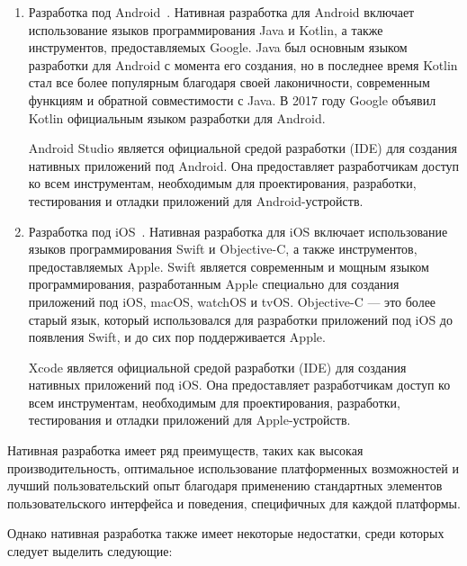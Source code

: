 \documentclass[14pt, russian]{scrartcl}
\begin{document}
\begin{enumerate}
    \item Разработка под Android~\cite{android-dev}. Нативная разработка для Android включает использование языков программирования Java и Kotlin, а также инструментов, предоставляемых Google. Java был основным языком разработки для Android с момента его создания, но в последнее время Kotlin стал все более популярным благодаря своей лаконичности, современным функциям и обратной совместимости с Java. В 2017 году Google объявил Kotlin официальным языком разработки для Android.

    Android Studio является официальной средой разработки (IDE) для создания нативных приложений под Android. Она предоставляет разработчикам доступ ко всем инструментам, необходимым для проектирования, разработки, тестирования и отладки приложений для Android-устройств.
    \item Разработка под iOS~\cite{ios-dev}. Нативная разработка для iOS включает использование языков программирования Swift и Objective-C, а также инструментов, предоставляемых Apple. Swift является современным и мощным языком программирования, разработанным Apple специально для создания приложений под iOS, macOS, watchOS и tvOS. Objective-C --- это более старый язык, который использовался для разработки приложений под iOS до появления Swift, и до сих пор поддерживается Apple.

    Xcode является официальной средой разработки (IDE) для создания нативных приложений под iOS. Она предоставляет разработчикам доступ ко всем инструментам, необходимым для проектирования, разработки, тестирования и отладки приложений для Apple-устройств.
\end{enumerate}

Нативная разработка имеет ряд преимуществ, таких как высокая производительность, оптимальное использование платформенных возможностей и лучший пользовательский опыт благодаря применению стандартных элементов пользовательского интерфейса и поведения, специфичных для каждой платформы.

Однако нативная разработка также имеет некоторые недостатки, среди которых следует выделить следующие:
\end{document}
